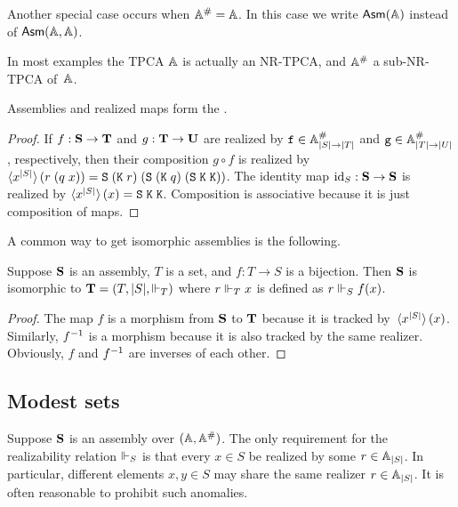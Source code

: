 Another special case occurs when $\compAA = \AA$. In this case we write
$\Asm{\AA}$ instead of $\Asm{\AA,\AA}$.

In most examples the TPCA $\AA$ is actually an NR-TPCA, and $\compAA$ a
sub-NR-TPCA of~$\AA$.

\begin{proposition}
  Assemblies and realized maps form the .
\end{proposition}

\begin{proof}
  If $f : \asm{S} \to \asm{T}$ and $g : \asm{T} \to \asm{U}$ are
  realized by $\R{f} \in \compAtyp{|S| \to |T|}$ and $\R{g} \in
  \compAtyp{|T| \to |U|}$, respectively, then their composition $g
  \circ f$ is realized by $\pcalam{\annot{x}{|S|}}{r\;(q\;x)} =
  \combS\;(\combK\;r)\;(\combS\;(\combK\;q)\;(\combS\;\combK\;\combK))$.
  The identity map $\id_S : \asm{S} \to \asm{S}$ is realized by
  $\pcalam{\annot{x}{|S|}}{x} = \combS\;\combK\;\combK$. Composition
  is associative because it is just composition of maps.
\end{proof}

A common way to get isomorphic assemblies is the following.

\begin{lemma}
  \label{lemma:iso-assembly}
  Suppose $\asm{S}$ is an assembly, $T$ is a set, and $f : T \to S$ is
  a bijection. Then $\asm{S}$ is isomorphic to $\asm{T} = (T, |S|,
  {\rz_T})$ where $r \rz_T x$ is defined as $r \rz_S f(x)$.
\end{lemma}

\begin{proof}
  The map $f$ is a morphism from $\asm{S}$ to $\asm{T}$ because it is
  tracked by~$\pcalam{\annot{x}{|S|}}{x}$. Similarly, $\inv{f}$ is a
  morphism because it is also tracked by the same realizer. Obviously,
  $f$ and $\inv{f}$ are inverses of each other.
\end{proof}


\subsection{Modest sets}
\label{sec:modest-sets}

Suppose $\asm{S}$ is an assembly over $(\AA, \compAA)$. The only
requirement for the realizability relation $\rz_S$ is that every $x
\in S$ be realized by some $r \in \xAtyp{S}$. In particular, different
elements $x, y \in S$ may share the same realizer $r \in \xAtyp{S}$.
It is often reasonable to prohibit such anomalies.


